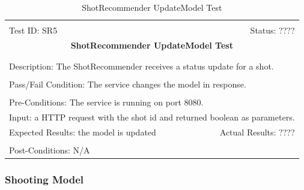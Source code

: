 \documentclass[11pt]{article}
\begin{document}
\begin{center}
\begin{table}[H]
\begin{tabular}{|l r|}\hline&\\[-2mm]
	Test ID: SR5	&Status: ????\\[-3mm]
	\multicolumn{2}{|c|}{\textbf{\large{ShotRecommender UpdateModel Test}}}\\&\\\hline&\\[-3mm]
	\multicolumn{2}{|p{\textwidth}|}{Description: The ShotRecommender receives a status update for a shot.}\\[1mm]\hline&\\[-3mm]
	\multicolumn{2}{|p{\textwidth}|}{Pass/Fail Condition: The service changes the model in response.}\\[1mm]\hline&\\[-3mm]
	\multicolumn{2}{|p{\textwidth}|}{Pre-Conditions: The service is running on port 8080.}\\[4mm]
	\multicolumn{2}{|p{\textwidth}|}{Input: a HTTP request with the shot id and returned boolean as parameters.}\\[2mm]\hline
	\multicolumn{1}{|p{0.49\textwidth}}{Expected Results: the model is updated}	&\multicolumn{1}{|p{0.45\textwidth}|}{Actual Results: ????}\\\hline&\\[-3mm]
	\multicolumn{2}{|p{\textwidth}|}{Post-Conditions: N/A}\\\hline
\end{tabular}
\caption{ShotRecommender UpdateModel Test}
\end{table}
\end{center}

\subsubsection{Shooting Model}
\end{document}
